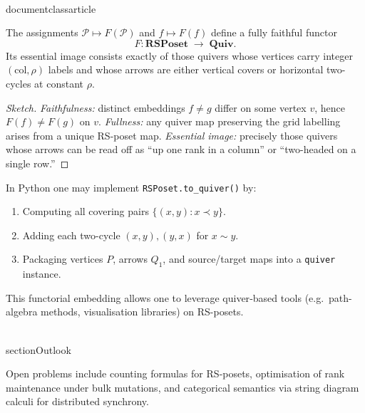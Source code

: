 \\documentclass{article}
\begin{document}
\begin{proposition}
The assignments \(\mathcal P\mapsto F(\mathcal P)\) and
\(f\mapsto F(f)\) define a fully faithful functor
\[
  F\colon \mathbf{RSPoset}\;\longrightarrow\;\mathbf{Quiv}.
\]
Its essential image consists exactly of those quivers whose vertices
carry integer \((\mathrm{col},\rho)\) labels and whose arrows are either
vertical covers or horizontal two-cycles at constant \(\rho\).
\end{proposition}

\begin{proof}[Sketch]
\emph{Faithfulness:} distinct embeddings \(f\neq g\) differ on some
vertex \(v\), hence \(F(f)\neq F(g)\) on \(v\).  
\emph{Fullness:} any quiver map preserving the grid labelling arises
from a unique RS-poset map.  
\emph{Essential image:} precisely those quivers whose arrows can be
read off as “up one rank in a column” or “two-headed on a single row.”
\end{proof}

\begin{remark}
In Python one may implement
\texttt{RSPoset.to\_quiver()} by:
\begin{enumerate}
  \item Computing all covering pairs \(\{(x,y):x\prec y\}\).
  \item Adding each two-cycle \((x,y),(y,x)\) for \(x\sim y\).
  \item Packaging vertices \(P\), arrows \(Q_1\), and source/target
        maps into a \texttt{quiver} instance.
\end{enumerate}
This functorial embedding allows one to leverage quiver‐based tools
(e.g.\ path-algebra methods, visualisation libraries) on RS-posets.
\end{remark}


\\section{Outlook}

Open problems include counting formulas for RS‑posets, optimisation of
rank maintenance under bulk mutations, and categorical semantics via
string diagram calculi for distributed synchrony.

\
\end{document}
